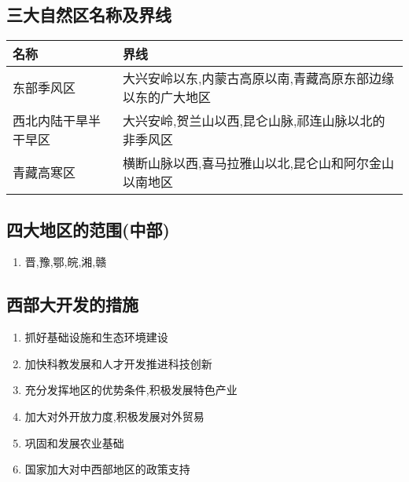 \documentclass[a4paper]{article}
\begin{document}
    \subsection{三大自然区名称及界线}
    \begin{table}[h]
        \begin{tabular}{|l|l|}
            \hline
            名称    &   界线    \\
            \hline
            东部季风区  &   大兴安岭以东,内蒙古高原以南,青藏高原东部边缘以东的广大地区    \\
            \hline
            西北内陆干旱半干早区    &   大兴安岭,贺兰山以西,昆仑山脉,祁连山脉以北的非季风区   \\
            \hline
            青藏高寒区  &   横断山脉以西,喜马拉雅山以北,昆仑山和阿尔金山以南地区    \\
            \hline
        \end{tabular}
    \end{table}
    \subsection{四大地区的范围(中部)}
    \begin{enumerate}
        \item 晋,豫,鄂,皖,湘,赣
    \end{enumerate}
    \subsection{西部大开发的措施}
    \begin{enumerate}
        \item 抓好基础设施和生态环境建设
        \item 加快科教发展和人才开发推进科技创新
        \item 充分发挥地区的优势条件,积极发展特色产业
        \item 加大对外开放力度,积极发展对外贸易
        \item 巩固和发展农业基础 %
        \item 国家加大对中西部地区的政策支持
    \end{enumerate}
\end{document}
